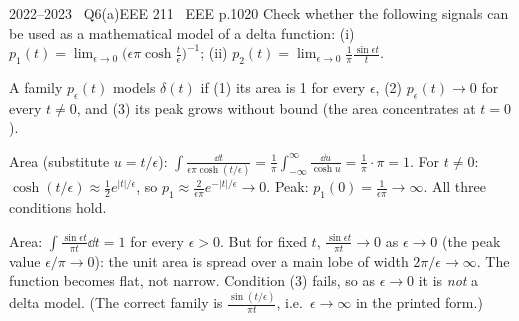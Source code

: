 \begin{qcard}{2022--2023 \textbullet\ Q6(a)}{EEE 211 \textbullet\ EEE p.10}{20}
Check whether the following signals can be used as a mathematical model of a delta function:
(i) $p_1(t)=\displaystyle\lim_{\epsilon\to0}\Big(\epsilon\pi\cosh\frac t\epsilon\Big)^{-1}$; \qquad (ii) $p_2(t)=\displaystyle\lim_{\epsilon\to0}\frac1\pi\frac{\sin\epsilon t}{t}$.
\end{qcard}
\begin{solution}
A family $p_\epsilon(t)$ models $\delta(t)$ if (1) its area is 1 for every $\epsilon$, (2) $p_\epsilon(t)\to0$ for every $t\ne0$, and (3) its peak grows without bound (the area concentrates at $t=0$).

 Area (substitute $u=t/\epsilon$): $\displaystyle\int\frac{\dd t}{\epsilon\pi\cosh(t/\epsilon)}=\frac1\pi\int_{-\infty}^\infty\frac{\dd u}{\cosh u}=\frac1\pi\cdot\pi=1$. For $t\ne0$: $\cosh(t/\epsilon)\approx\frac12e^{|t|/\epsilon}$, so $p_1\approx\frac{2}{\epsilon\pi}e^{-|t|/\epsilon}\to0$. Peak: $p_1(0)=\frac1{\epsilon\pi}\to\infty$. All three conditions hold.

 Area: $\int\frac{\sin\epsilon t}{\pi t}\dd t=1$ for every $\epsilon>0$. But for fixed $t$, $\frac{\sin\epsilon t}{\pi t}\to0$ as $\epsilon\to0$ (the peak value $\epsilon/\pi\to0$): the unit area is spread over a main lobe of width $2\pi/\epsilon\to\infty$. The function becomes flat, not narrow. Condition (3) fails, so as $\epsilon\to0$ it is \emph{not} a delta model. (The correct family is $\frac{\sin(t/\epsilon)}{\pi t}$, i.e.\ $\epsilon\to\infty$ in the printed form.)
\end{solution}

